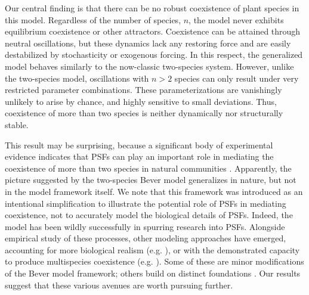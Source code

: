 \documentclass[11pt]{article}
\begin{document}
Our central finding is that there can be no robust coexistence of plant species in this model. Regardless of the number of species, $n$, the model never exhibits equilibrium coexistence or other attractors. Coexistence can be attained through neutral oscillations, but these dynamics lack any restoring force and are easily destabilized by stochasticity or exogenous forcing. In this respect, the generalized model behaves similarly to the now-classic two-species system. However, unlike the two-species model, oscillations with $n > 2$ species can only result under very restricted parameter combinations. These parameterizations are vanishingly unlikely to arise by chance, and highly sensitive to small deviations. Thus, coexistence of more than two species is neither dynamically nor structurally stable.

This result may be surprising, because a significant body of experimental evidence indicates that PSFs can play an important role in mediating the coexistence of more than two species in natural communities \citep{kulmatiski2008plant,petermann2008janzen,mangan2010negative,bever2015maintenance}. Apparently, the picture suggested by the two-species Bever model generalizes in nature, but not in the model framework itself. We note that this framework was introduced as an intentional simplification to illustrate the potential role of PSFs in mediating coexistence, not to accurately model the biological details of PSFs. Indeed, the model has been wildly successfully in spurring research into PSFs. Alongside empirical study of these processes, other modeling approaches have emerged, accounting for more biological realism (e.g. \citep{umbanhowar2005simple,eppstein2007invasiveness,bever2010rooting}), or with the demonstrated capacity to produce multispecies coexistence (e.g. \citep{bonanomi2005negative,miller2021metapopulations}). Some of these are minor modifications of the Bever model framework; others build on distinct foundations \citep{ke2015incorporating,ke2020effects}. Our results suggest that these various avenues are worth pursuing further.
\end{document}
